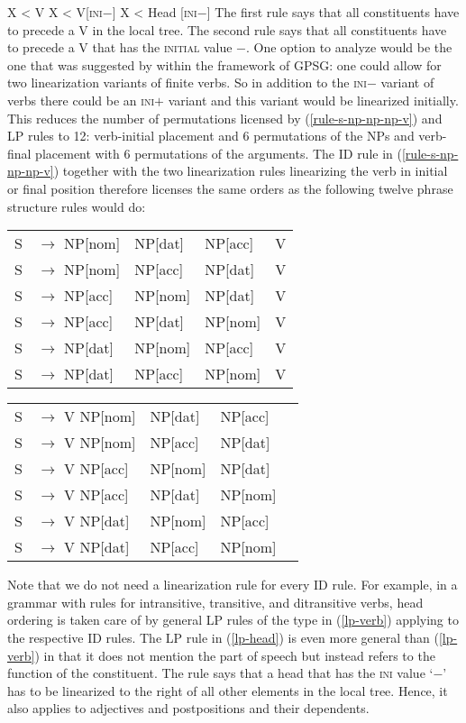\documentclass[output=paper,biblatex,babelshorthands,newtxmath,draftmode,colorlinks,citecolor=brown]{langscibook}
\begin{document}
\eal
\ex X < V
\ex\label{lp-verb} X < V[\textsc{ini}$-$]
\ex\label{lp-head} X < Head [\textsc{ini}$-$]
\zl
The first rule says that all constituents have to precede a V in the local tree. The second rule
says that all constituents have to precede a V that has the \textsc{initial} value $-$. One option
to analyze  would be the one that was suggested by \citet[Section~2.3]{Uszkoreit87a} within the framework
of GPSG\indexgpsg: one could allow for two linearization variants of finite verbs. So in addition to the
\textsc{ini}$-$ variant of verbs there could be an \textsc{ini}$+$ variant and this variant would be
linearized initially. This reduces the number of permutations licensed by (\ref{rule-s-np-np-np-v})
and LP rules to 12: verb-initial placement and 6 permutations of the NPs and verb-final placement with 6
permutations of the arguments. The ID rule in (\ref{rule-s-np-np-np-v}) together with the two
linearization rules linearizing the verb in initial or final position therefore licenses the same
orders as the following twelve phrase structure rules would do:
\eal
\ex \begin{tabular}[t]{@{}l@{ }l@{ }l@{ }l@{ }l@{ }}
S  & $\to$ NP[nom]& NP[dat] & NP[acc] & V\\
S  & $\to$ NP[nom]& NP[acc] & NP[dat] & V\\
S  & $\to$ NP[acc]& NP[nom] & NP[dat] & V\\
S  & $\to$ NP[acc]& NP[dat] & NP[nom] & V\\
S  & $\to$ NP[dat]& NP[nom] & NP[acc] & V\\
S  & $\to$ NP[dat]& NP[acc] & NP[nom] & V\\
\end{tabular}
\ex \begin{tabular}[t]{@{}l@{ }l@{ }l@{ }l@{ }l}
S  & $\to$ V NP[nom]& NP[dat] & NP[acc]\\
S  & $\to$ V NP[nom]& NP[acc] & NP[dat]\\
S  & $\to$ V NP[acc]& NP[nom] & NP[dat]\\
S  & $\to$ V NP[acc]& NP[dat] & NP[nom]\\
S  & $\to$ V NP[dat]& NP[nom] & NP[acc]\\
S  & $\to$ V NP[dat]& NP[acc] & NP[nom]\\
\end{tabular}
\zl
{}
Note that we do not need a linearization rule for every ID rule. For example, in a grammar
with rules for intransitive, transitive, and ditransitive verbs, head ordering is taken care of by
general LP rules of the type in (\ref{lp-verb}) applying to the respective ID rules. 
The LP rule in (\ref{lp-head}) is even more general than (\ref{lp-verb}) in that it does not
mention the part of speech but instead refers to the function of the constituent. The rule says that
a head that has the \textsc{ini} value `$-$' has to be linearized to the right of all other elements
in the local tree. Hence, it also applies to adjectives and postpositions and their dependents.
\end{document}
